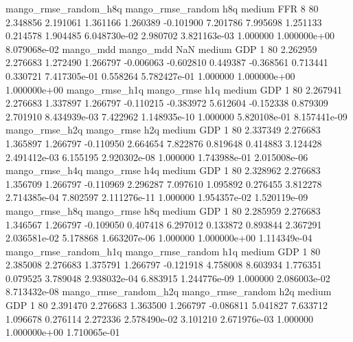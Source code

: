 mango_rmse_random_h8q mango_rmse_random                  h8q     medium      FFR                 8 80  2.348856       2.191061 1.361166       1.260389   -0.101900      7.201786      7.995698     1.251133       0.214578  1.904485 6.048730e-02     2.980702   3.821163e-03            1.000000    1.000000e+00        8.079068e-02
            mango_mdd         mango_mdd                  NaN     medium      GDP                 1 80  2.262959       2.276683 1.272490       1.266797   -0.006063     -0.602810      0.449387    -0.368561       0.713441  0.330721 7.417305e-01     0.558264   5.782427e-01            1.000000    1.000000e+00        1.000000e+00
       mango_rmse_h1q        mango_rmse                  h1q     medium      GDP                 1 80  2.267941       2.276683 1.337897       1.266797   -0.110215     -0.383972      5.612604    -0.152338       0.879309  2.701910 8.434939e-03     7.422962   1.148935e-10            1.000000    5.820108e-01        8.157441e-09
       mango_rmse_h2q        mango_rmse                  h2q     medium      GDP                 1 80  2.337349       2.276683 1.365897       1.266797   -0.110950      2.664654      7.822876     0.819648       0.414883  3.124428 2.491412e-03     6.155195   2.920302e-08            1.000000    1.743988e-01        2.015008e-06
       mango_rmse_h4q        mango_rmse                  h4q     medium      GDP                 1 80  2.328962       2.276683 1.356709       1.266797   -0.110969      2.296287      7.097610     1.095892       0.276455  3.812278 2.714385e-04     7.802597   2.111276e-11            1.000000    1.954357e-02        1.520119e-09
       mango_rmse_h8q        mango_rmse                  h8q     medium      GDP                 1 80  2.285959       2.276683 1.346567       1.266797   -0.109050      0.407418      6.297012     0.133872       0.893844  2.367291 2.036581e-02     5.178868   1.663207e-06            1.000000    1.000000e+00        1.114349e-04
mango_rmse_random_h1q mango_rmse_random                  h1q     medium      GDP                 1 80  2.385008       2.276683 1.375791       1.266797   -0.121918      4.758008      8.603934     1.776351       0.079525  3.789048 2.938032e-04     6.883915   1.244776e-09            1.000000    2.086003e-02        8.713432e-08
mango_rmse_random_h2q mango_rmse_random                  h2q     medium      GDP                 1 80  2.391470       2.276683 1.363500       1.266797   -0.086811      5.041827      7.633712     1.096678       0.276114  2.272336 2.578490e-02     3.101210   2.671976e-03            1.000000    1.000000e+00        1.710065e-01
